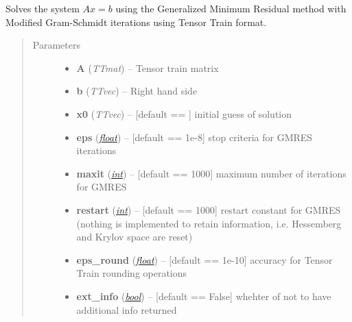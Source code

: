 \documentclass[a4paper,10pt,english]{sphinxmanual}
\begin{document}
\begin{fulllineitems}
\label{api-multilinalg:TensorToolbox.multilinalg.gmres}
Solves the system \(Ax=b\) using the Generalized Minimum Residual method with Modified Gram-Schmidt iterations using Tensor Train format.
\begin{quote}\begin{description}
\item[{Parameters}] \leavevmode\begin{itemize}
\item {} 
\textbf{A} (\emph{TTmat}) -- Tensor train matrix

\item {} 
\textbf{b} (\emph{TTvec}) -- Right hand side

\item {} 
\textbf{x0} (\emph{TTvec}) -- {[}default == {\hyperref[api-core:TensorToolbox.core.zerosvec]{}}{]} initial guess of solution 

\item {} 
\textbf{eps} (\href{http://docs.python.org/library/functions.html\#float}{\emph{float}}) -- {[}default == 1e-8{]} stop criteria for GMRES iterations

\item {} 
\textbf{maxit} (\href{http://docs.python.org/library/functions.html\#int}{\emph{int}}) -- {[}default == 1000{]} maximum number of iterations for GMRES

\item {} 
\textbf{restart} (\href{http://docs.python.org/library/functions.html\#int}{\emph{int}}) -- {[}default == 1000{]} restart constant for GMRES (nothing is implemented to retain information, i.e. Hessemberg and Krylov space are reset)

\item {} 
\textbf{eps\_round} (\href{http://docs.python.org/library/functions.html\#float}{\emph{float}}) -- {[}default == 1e-10{]} accuracy for Tensor Train rounding operations

\item {} 
\textbf{ext\_info} (\href{http://docs.python.org/library/functions.html\#bool}{\emph{bool}}) -- {[}default == False{]} whehter of not to have additional info returned

\end{itemize}


\end{description}
\end{quote}
\end{fulllineitems}
\end{document}
